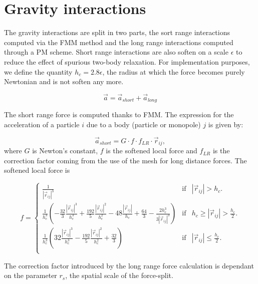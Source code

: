 \documentclass[a4paper,10pt]{report}
\begin{document}
\section{Gravity interactions}

The gravity interactions are split in two parts, the sort range interactions computed via the FMM method and the long 
range interactions computed through a PM scheme. Short range interactions are also soften on a scale $\epsilon$ to 
reduce the effect of spurious two-body relaxation. For implementation purposes, we define the quantity $h_c = 
2.8\epsilon$, the radius at which the force becomes purely Newtonian and is not soften any more.

\begin{equation}
 \vec{a} = \vec{a}_{short} + \vec{a}_{long}
\end{equation}


The short range force is computed thanks to FMM. The expression for the acceleration of a particle $i$ due to a body 
(particle or monopole) $j$ is given by:

\begin{equation}
 \vec{a}_{short} = G\cdot f \cdot f_{LR} \cdot \vec{r}_{ij},
\end{equation}
 where $G$ is Newton's constant, $f$ is the softened local force and $f_{LR}$ is the correction factor coming from the use of the mesh for long distance forces.
 The softened local force is 

\begin{equation}
\nonumber
 f = \left\lbrace \begin{array}{rcl}
                    \frac{1}{|\vec{r}_{ij}|^3}  & \mbox{if} & |\vec{r}_{ij}| > h_c\Big. \\
                    \frac{1}{h_c^3}\left(-\frac{32}{3}\frac{|\vec{r}_{ij}|^3}{h_c^3} + \frac{192}{5}\frac{|\vec{r}_{ij}|^2}{h_c^2} - 48\frac{|\vec{r}_{ij}|}{h_c} + \frac{64}{3} - \frac{2h_c^3}{3|\vec{r}_{ij}|^3} \right)  & \mbox{if} & h_c \geq |\vec{r}_{ij}| > \frac{h_c}{2}\Big. \\	
                    \frac{1}{h_c^3}\left(32\frac{|\vec{r}_{ij}|^3}{h_c^3} - \frac{192}{5}\frac{|\vec{r}_{ij}|^2}{h_c^2} + \frac{32}{3}\right)  & \mbox{if} & |\vec{r}_{ij}| \leq \frac{h_c}{2}\Big. \\		
		    \end{array}\right.
\end{equation}

The correction factor introduced by the long range force calculation is dependant on the parameter $r_s$, the spatial scale of the force-split.
\end{document}
